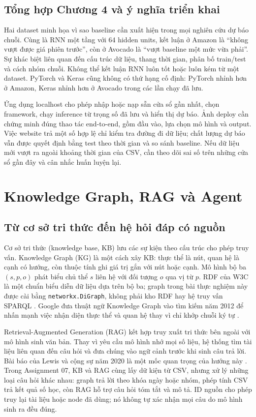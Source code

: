 \documentclass[12pt,a4paper]{report}
\begin{document}
\section{Tổng hợp Chương 4 và ý nghĩa triển khai}
Hai dataset minh họa vì sao baseline cần xuất hiện trong mọi nghiên cứu dự báo chuỗi. Cùng là RNN một tầng với 64 hidden units, kết luận ở Amazon là ``không vượt được giá phiên trước'', còn ở Avocado là ``vượt baseline một mức vừa phải''. Sự khác biệt liên quan đến cấu trúc dữ liệu, thang thời gian, phân bố train/test và cách nhóm chuỗi. Không thể kết luận RNN luôn tốt hoặc luôn kém từ một dataset. PyTorch và Keras cũng không có thứ hạng cố định: PyTorch nhỉnh hơn ở Amazon, Keras nhỉnh hơn ở Avocado trong các lần chạy đã lưu.

Ứng dụng localhost cho phép nhập hoặc nạp sẵn cửa sổ gần nhất, chọn framework, chạy inference từ trọng số đã lưu và hiển thị dự báo. Ảnh deploy cần chứng minh đúng thao tác end-to-end, gồm đầu vào, lựa chọn mô hình và output. Việc website trả một số hợp lệ chỉ kiểm tra đường đi dữ liệu; chất lượng dự báo vẫn được quyết định bằng test theo thời gian và so sánh baseline. Nếu dữ liệu mới vượt ra ngoài khoảng thời gian của CSV, cần theo dõi sai số trên những cửa sổ gần đây và cân nhắc huấn luyện lại.


\clearpage

\chapter{Knowledge Graph, RAG và Agent}\label{ch:kb-rag}
\section{Từ cơ sở tri thức đến hệ hỏi đáp có nguồn}
Cơ sở tri thức (knowledge base, KB) lưu các sự kiện theo cấu trúc cho phép truy vấn. Knowledge Graph
(KG) là một cách xây KB: thực thể là nút, quan hệ là cạnh có hướng, còn thuộc tính ghi giá trị gắn
với nút hoặc cạnh. Mô hình bộ ba $(s,p,o)$ phát biểu chủ thể $s$ liên hệ với đối tượng $o$ qua
vị từ $p$. RDF của W3C là một chuẩn biểu diễn dữ liệu dựa trên bộ ba; graph trong bài thực nghiệm
này được cài bằng \texttt{networkx.DiGraph}, không phải kho RDF hay hệ truy vấn SPARQL
\cite{essay03-w3c}. Google đưa thuật ngữ Knowledge Graph vào tìm kiếm năm 2012 để nhấn mạnh việc
nhận diện thực thể và quan hệ thay vì chỉ khớp chuỗi ký tự \cite{essay03-google}.

Retrieval-Augmented Generation (RAG) kết hợp truy xuất tri thức bên ngoài với mô hình sinh văn bản.
Thay vì yêu cầu mô hình nhớ mọi số liệu, hệ thống tìm tài liệu liên quan đến câu hỏi và đưa chúng
vào ngữ cảnh trước khi sinh câu trả lời. Bài báo của Lewis và cộng sự năm 2020 là một mốc quan
trọng của hướng này \cite{essay03-lewis}. Trong Assignment 07, KB và RAG cùng lấy dữ kiện từ CSV,
nhưng xử lý những loại câu hỏi khác nhau: graph trả lời theo khóa ngày hoặc nhóm, phép tính CSV
trả kết quả số học, còn RAG hỗ trợ câu hỏi tóm tắt và mô tả. ID nguồn cho phép truy lại tài liệu
hoặc node đã dùng; nó không tự xác nhận mọi câu do mô hình sinh ra đều đúng.
\end{document}
